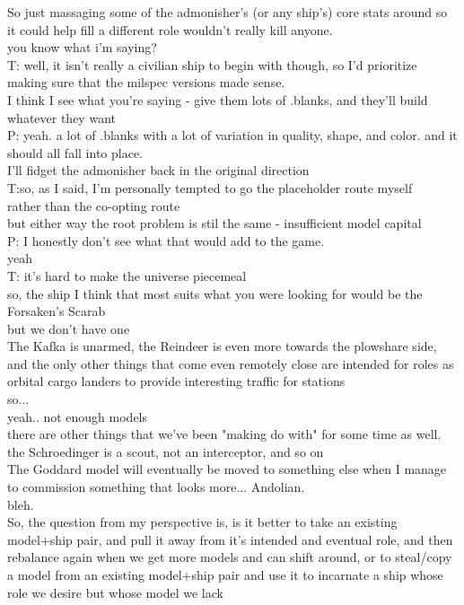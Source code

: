 So just massaging some of the admonisher's (or any ship's) core stats around so it could help fill a different role wouldn't really kill anyone.\\
you know what i'm saying?\\
T: well, it isn't really a civilian ship to begin with though, so I'd prioritize making sure that the milspec versions made sense.\\
I think I see what you're saying - give them lots of .blanks, and they'll build whatever they want\\
P: yeah. a lot of .blanks with a lot of variation in quality, shape, and color. and it should all fall into place.\\
I'll fidget the admonisher back in the original direction\\
T:so, as I said, I'm personally tempted to go the placeholder route myself\\
rather than the co-opting route\\
but either way the root problem is stil the same - insufficient model capital\\
P: I honestly don't see what that would add to the game.\\
yeah\\
T: it's hard to make the universe piecemeal\\
so, the ship I think that most suits what you were looking for would be the Forsaken's Scarab\\
but we don't have one\\
The Kafka is unarmed, the Reindeer is even more towards the plowshare side, and the only other things that come even remotely close are intended for roles as orbital cargo landers to provide interesting traffic for stations\\
so... \\
yeah.. not enough models\\
there are other things that we've been "making do with" for some time as well.\\
the Schroedinger is a scout, not an interceptor, and so on \\
The Goddard model will eventually be moved to something else when I manage to commission something that looks more... Andolian.\\
bleh.\\
So, the question from my perspective is, is it better to take an existing model+ship pair, and pull it away from it's intended and eventual role, and then rebalance again when we get more models and can shift around, or to steal/copy a model from an existing model+ship pair and use it to incarnate a ship whose role we desire but whose model we lack\\
